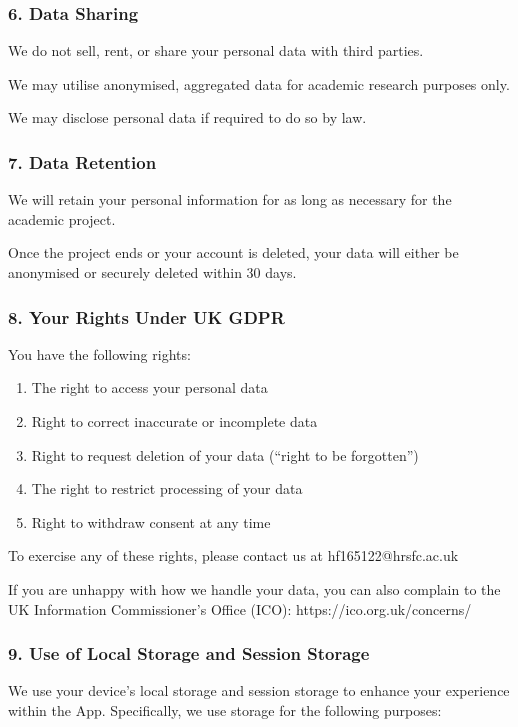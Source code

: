 \subsubsection*{6. Data Sharing}
We do not sell, rent, or share your personal data with third parties.

We may utilise anonymised, aggregated data for academic research purposes only.

We may disclose personal data if required to do so by law.

\subsubsection*{7. Data Retention}
We will retain your personal information for as long as necessary for the academic project.

Once the project ends or your account is deleted, your data will either be anonymised or securely deleted within 30 days.

\subsubsection*{8. Your Rights Under UK GDPR}

You have the following rights:
\begin{enumerate}
	\item The right to access your personal data
	\item Right to correct inaccurate or incomplete data
	\item Right to request deletion of your data (“right to be forgotten”)
	\item The right to restrict processing of your data
	\item Right to withdraw consent at any time
\end{enumerate}

To exercise any of these rights, please contact us at hf165122@hrsfc.ac.uk

If you are unhappy with how we handle your data, you can also complain to the UK Information Commissioner's Office (ICO):  https://ico.org.uk/concerns/

\subsubsection*{9. Use of Local Storage and Session Storage}
We use your device's local storage and session storage to enhance your experience within the App. Specifically, we use storage for the following purposes:

